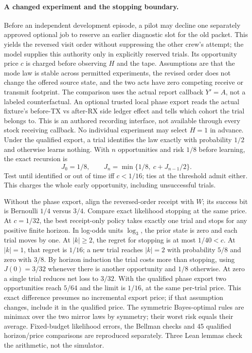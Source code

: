 \documentclass[11pt]{article}
\begin{document}
\paragraph{A changed experiment and the stopping boundary.}
Before an independent development episode, a pilot may decline
one separately approved optional job to reserve an earlier
diagnostic slot for the old packet. This yields the reversed
visit order without suppressing the other crew's attempt;
the model supplies this authority only in explicitly reserved
trials. Its opportunity price \(c\) is charged before observing
\(H\) and the tape. Assumptions are that the mode law is stable
across permitted experiments, the revised order does not change
the offered source state, and the two acts have zero competing
receive or transmit footprint. The comparison uses the actual
report callback \(Y'=A\), not a labeled counterfactual. An
optional trusted local phase export reads the actual fixture's
before-TX vs after-RX side ledger effect and tells which cohort
the trial belongs to. This is an authored recording interface,
not available through every stock receiving callback. No
individual experiment may select \(H=1\) in advance.
Under the qualified export, a trial identifies the law exactly
with probability \(1/2\) and otherwise learns nothing. With
\(n\) opportunities and risk \(1/8\) before learning, the exact
recursion is
\[
 J_0=1/8,\qquad
 J_n=\min\{1/8,\ c+J_{n-1}/2\}.
\]
Test until identified or out of time iff \(c<1/16\); ties at
the threshold admit either. This charges the whole early
opportunity, including unsuccessful trials.

Without the phase export, align the reversed-order receipt
with \(W\); its success bit is Bernoulli \(1/4\) versus \(3/4\).
Compare exact likelihood stopping at the same price. At
\(c=1/32\), the best receipt-only policy takes exactly one trial
and stops for any positive finite horizon. In log-odds units
\(\log_3\), the prior state is zero and each trial moves by one.
At \(|k|\ge2\), the regret for stopping is at most \(1/40<c\).
At \(|k|=1\), that regret is \(1/16\); a new trial reaches
\(|k|=2\) with probability \(5/8\) and zero with \(3/8\).
By horizon induction the trial costs more than stopping, using
\(J(0)=3/32\) whenever there is another opportunity and \(1/8\)
otherwise. At zero a single trial reduces net loss to \(3/32\).
With the qualified phase export two opportunities reach \(5/64\)
and the limit is \(1/16\), at the same per-trial price.
This exact difference presumes no incremental export price;
if that assumption changes, include it in the qualified price.
The symmetric Bayes-optimal rules are minimax over the two
mirror laws by symmetry; their worst risk equals their average.
Fixed-budget likelihood errors, the Bellman checks and 45
qualified horizon/price comparisons are reproduced separately.
Three Lean lemmas check the arithmetic, not the simulator.
\end{document}
